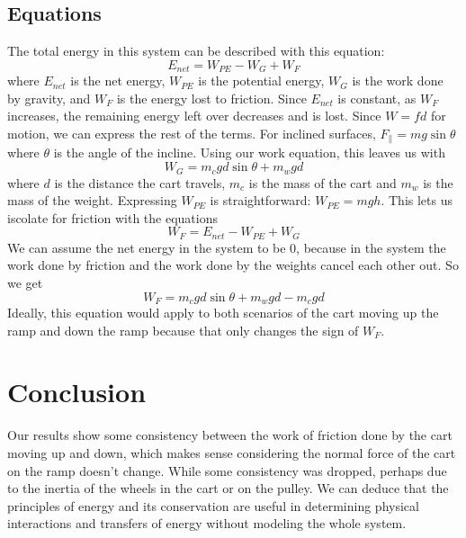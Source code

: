 \documentclass[12pt]{article}
\begin{document}
        \subsection{Equations}
            The total energy in this system can be described with this equation:
            \begin{equation}
                E_{net} = W_{PE} - W_G + W_F
            \end{equation}
            where $E_{net}$ is the net energy, $W_{PE}$ is the potential energy,
            $W_G$ is the work done by gravity, and $W_F$ is the energy lost to
            friction. Since $E_{net}$ is constant, as $W_F$ increases, the 
            remaining energy left over decreases and is lost. Since $W = fd$
            for motion, we can express the rest of the terms. For inclined
            surfaces, $F_{\parallel}  = mg\sin{\theta}$ where $\theta$ is the
            angle of the incline. Using our work equation, this leaves us with
            \begin{equation}
                W_G = m_cgd\sin{\theta} + m_wgd
            \end{equation}
            where $d$ is the distance the cart travels, $m_c$ is the mass of
            the cart and $m_w$ is the mass of the weight. Expressing $W_{PE}$ is
            straightforward: $W_{PE} = mgh$. This lets us iscolate for friction
            with the equations
            \begin{equation}
                W_F = E_{net} - W_{PE} + W_G
            \end{equation}
            We can assume the net energy in the system to be 0, because in the
            system the work done by friction and the work done by the weights
            cancel each other out. So we get
            \begin{equation}
                W_F = m_cgd\sin{\theta} + m_wgd - m_cgd
            \end{equation}
            Ideally, this equation would apply to both scenarios of the cart
            moving up the ramp and down the ramp because that only changes
            the sign of $W_F$.

    \section{Conclusion}
        Our results show some consistency between the work of friction done by
        the cart moving up and down, which makes sense considering the normal
        force of the cart on the ramp doesn't change. While some consistency
        was dropped, perhaps due to the inertia of the wheels in the cart or
        on the pulley. We can deduce that the
        principles of energy and its conservation are useful in determining
        physical interactions and transfers of energy without modeling the
        whole system.
\end{document}
